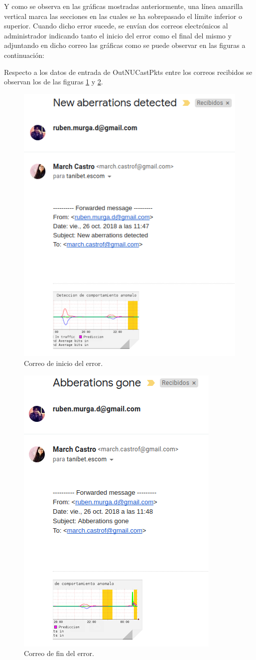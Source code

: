 Y como se observa en las gráficas mostradas anteriormente, una línea amarilla vertical marca las secciones en las cuales se ha sobrepasado el límite inferior o superior. Cuando dicho error sucede, se envían dos correos electrónicos al administrador indicando tanto el inicio del error como el final del mismo y adjuntando en dicho correo las gráficas como se puede observar en las figuras a continuación:
\\ \par
Respecto a los datos de entrada de OutNUCastPkts entre los correos recibidos se observan los de las figuras \ref{image:inicio} y \ref{image:fin}.
\FloatBarrier
\begin{figure}[htbp!]
		\centering
			\includegraphics[width=.5 \textwidth]{images/inicio}
		\caption{Correo de inicio del error.}
		\label{image:inicio}
\end{figure}
\FloatBarrier
\FloatBarrier
\begin{figure}[htbp!]
		\centering
			\includegraphics[width=.4 \textwidth]{images/fin}
		\caption{Correo de fin del error.}
		\label{image:fin}
\end{figure}
